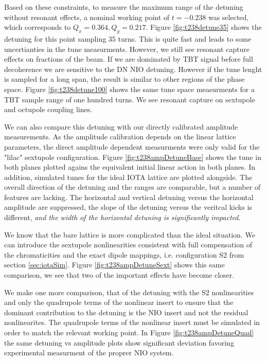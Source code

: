 Based on these constraints, to measure the maximum range of the detuning without resonant effects, a nominal working point of $t=-0.238$ was selected, which corresponds to $Q_x = 0.364, Q_y = 0.217$. Figure \ref{fig:t238detune35} shows the detuning for this point sampling 35 turns. This is quite fast and leads to some uncertianties in the tune measurments. However, we still see resonant capture effects on fractions of the beam. If we are dominated by TBT signal before full decoherence we are sensitive to the DN NIO detuning. However if the tune lenght is sampled for a long span, the result is similar to other regions of the phase space. Figure \ref{fig:t238detune100} shows the same tune space measurments for a TBT sample range of one hundred turns. We see resonant capture on sextupole and octupole coupling lines.


We can also compare this detuning with our directly calibrated amplitude measurements. As the amplitude calibration depends on the linear lattice parameters, the direct amplitude dependent measurments were only valid for the "lilac" sextupole configuration. Figure \ref{fig:t238ampDetuneBase} shows the tune in both planes plotted agains the equivalent initial linear action in both planes. In addition, simulated tunes for the ideal IOTA lattice are plotted alongside. The overall direction of the detuning and the ranges are comparable, but a number of features are lacking. The horizontal and vertical detuning versus the horizontal amplitude are suppressed, the slope of the detuning versus the veritcal kicks is different, \textit{and the width of the horizontal detuning is significantly impacted}.

We know that the bare lattice is more complicated than the ideal situation. We can introduce the sextupole nonlinearities consistent with full compensation of the chromaticities and the exact dipole mappings, i.e. configuration S2 from section \ref{sec:iotaSim}. Figure \ref{fig:t238ampDetuneSext} shows this same comparison, we see that two of the important effects have become closer.

We make one more comparison, that of the detuning with the S2 nonlinearities and only the quadrupole terms of the nonlinear insert to ensure that the dominant contribution to the detuning is the NIO insert and not the residual nonlinearites. The quadrupole terms of the nonlinear insert must be simulated in order to match the relevant working point. In Figure \ref{fig:t238ampDetuneQuad} the same detuning vs amplitude plots show significant deviation favoring experimental measurment of the proprer NIO system.

